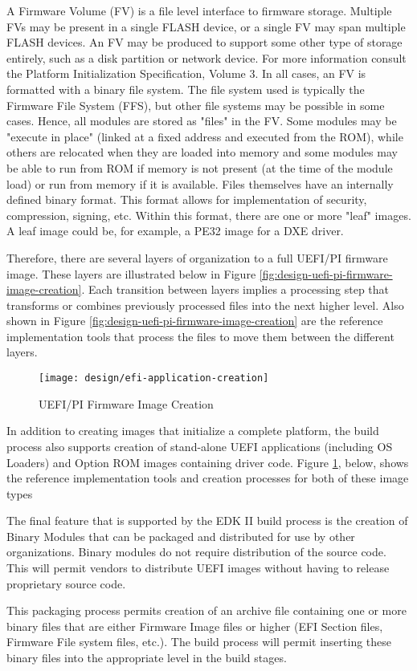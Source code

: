A Firmware Volume (FV) is a file level interface to firmware storage. Multiple FVs may be present in a single FLASH device, or a single FV may span multiple FLASH devices. An FV may be produced to support some other type of storage entirely, such as a disk partition or network device. For more information consult the Platform Initialization Specification, Volume 3.
In all cases, an FV is formatted with a binary file system. The file system used is typically the Firmware File System (FFS), but other file systems may be possible in some cases. Hence, all modules are stored as "files" in the FV. Some modules may be "execute in place" (linked at a fixed address and executed from the ROM), while others are relocated when they are loaded into memory and some modules may be able to run from ROM if memory is not present (at the time of the module load) or run from memory if it is available.
Files themselves have an internally defined binary format. This format allows for implementation of security, compression, signing, etc. Within this format, there are one or more "leaf" images. A leaf image could be, for example, a PE32 image for a DXE driver.

Therefore, there are several layers of organization to a full UEFI/PI firmware image. These layers are illustrated below in Figure \ref{fig:design-uefi-pi-firmware-image-creation}. Each transition between layers implies a processing step that transforms or combines previously processed files into the next higher level. Also shown in Figure \ref{fig:design-uefi-pi-firmware-image-creation} are the reference implementation tools that process the files to move them between the different layers.

\begin{figure}[h]
	\centering
	\texttt{[image: design/efi-application-creation]}
	\caption{UEFI/PI Firmware Image Creation}\label{fig:design-efi-application-creation}
\end{figure}


In addition to creating images that initialize a complete platform, the build process also supports creation of stand-alone UEFI applications (including OS Loaders) and Option ROM images containing driver code. Figure \ref{fig:design-efi-application-creation}, below, shows the reference implementation tools and creation processes for both of these image types

The final feature that is supported by the EDK II build process is the creation of Binary Modules that can be packaged and distributed for use by other organizations. Binary modules do not require distribution of the source code. This will permit vendors to distribute UEFI images without having to release proprietary source code.

This packaging process permits creation of an archive file containing one or more binary files that are either Firmware Image files or higher (EFI Section files, Firmware File system files, etc.). The build process will permit inserting these binary files into the appropriate level in the build stages.